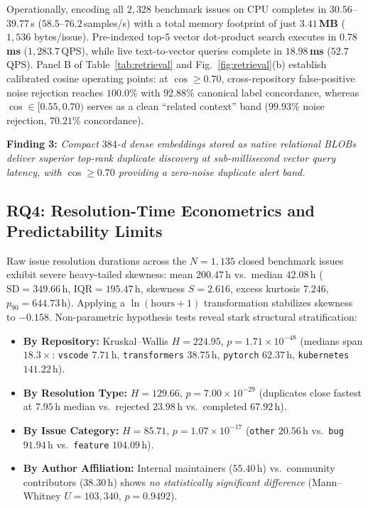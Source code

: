 \documentclass[conference]{IEEEtran}
\begin{document}
Operationally, encoding all $2{,}328$ benchmark issues on CPU completes in $30.56$--$39.77$\,s ($58.5$--$76.2$\,samples/s) with a total memory footprint of just \textbf{$3.41$\,MB} ($1{,}536$ bytes/issue). Pre-indexed top-$5$ vector dot-product search executes in \textbf{$0.78$\,ms} ($1{,}283.7$\,QPS), while live text-to-vector queries complete in \textbf{$18.98$\,ms} ($52.7$\,QPS). Panel B of Table~\ref{tab:retrieval} and Fig.~\ref{fig:retrieval}(b) establish calibrated cosine operating points: at $\cos \ge 0.70$, cross-repository false-positive noise rejection reaches \textbf{$100.0\%$} with \textbf{$92.88\%$} canonical label concordance, whereas $\cos \in [0.55, 0.70)$ serves as a clean ``related context'' band ($99.93\%$ noise rejection, $70.21\%$ concordance).

\textbf{Finding 3:} \emph{Compact $384$-d dense embeddings stored as native relational BLOBs deliver superior top-rank duplicate discovery at sub-millisecond vector query latency, with $\cos \ge 0.70$ providing a zero-noise duplicate alert band.}

\subsection{RQ4: Resolution-Time Econometrics and Predictability Limits}
\label{sec:results_resolution}

Raw issue resolution durations across the $N=1{,}135$ closed benchmark issues exhibit severe heavy-tailed skewness: mean $200.47$\,h vs.\ median $42.08$\,h ($\text{SD}=349.66$\,h, $\text{IQR}=195.47$\,h, skewness $S=2.616$, excess kurtosis $7.246$, $p_{90}=644.73$\,h). Applying a $\ln(\text{hours}+1)$ transformation stabilizes skewness to $-0.158$. Non-parametric hypothesis tests reveal stark structural stratification:
\begin{itemize}
    \item \textbf{By Repository:} Kruskal--Wallis $H = 224.95$, $p = 1.71 \times 10^{-48}$ (medians span $18.3\times$: \texttt{vscode} $7.71$\,h, \texttt{transformers} $38.75$\,h, \texttt{pytorch} $62.37$\,h, \texttt{kubernetes} $141.22$\,h).
    \item \textbf{By Resolution Type:} $H = 129.66$, $p = 7.00 \times 10^{-29}$ (duplicates close fastest at $7.95$\,h median vs.\ rejected $23.98$\,h vs.\ completed $67.92$\,h).
    \item \textbf{By Issue Category:} $H = 85.71$, $p = 1.07 \times 10^{-17}$ (\texttt{other} $20.56$\,h vs.\ \texttt{bug} $91.94$\,h vs.\ \texttt{feature} $104.09$\,h).
    \item \textbf{By Author Affiliation:} Internal maintainers ($55.40$\,h) vs.\ community contributors ($38.30$\,h) shows \emph{no statistically significant difference} (Mann--Whitney $U = 103{,}340$, $p = 0.9492$).
\end{itemize}
\end{document}
